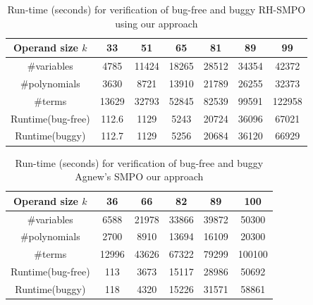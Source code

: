 \begin{table}[htb]
\centering
\caption{\small Run-time (seconds) for verification of bug-free and
  buggy RH-SMPO using our approach} 
\label{tbl:exp1}  
\begin{tabular}{|c||c|c|c|c|c|c|} 
\hline
Operand size $k$ & 33 & 51 & 65 & 81 & 89 & 99\\
\hline
\#variables & 4785 & 11424 & 18265 & 28512 & 34354 & 42372\\
\hline
\#polynomials & 3630 & 8721 & 13910 & 21789 & 26255 & 32373\\
\hline
\#terms & 13629 & 32793 & 52845 & 82539 & 99591 & 122958\\
\hline
\hline
Runtime(bug-free) & 112.6 & 1129 & 5243 & 20724 & 36096 & 67021\\
\hline
Runtime(buggy) & 112.7 & 1129 & 5256 & 20684 & 36120 & 66929\\
\hline
\end{tabular}
\end{table}

\begin{table}[hbt]
\centering
\caption{\small Run-time (seconds) for verification of
  bug-free and buggy Agnew's SMPO our approach}
\label{tbl:exp2}
\begin{tabular}{|c||c|c|c|c|c|} 
\hline
Operand size $k$ & 36 & 66 & 82 & 89 & 100 \\
\hline
\#variables & 6588 & 21978 & 33866 & 39872 & 50300\\
\hline
\#polynomials & 2700 & 8910 & 13694 & 16109 & 20300\\
\hline
\#terms & 12996 & 43626 & 67322 & 79299 & 100100 \\
\hline
\hline
Runtime(bug-free) & 113 & 3673 & 15117 & 28986 & 50692 \\
\hline
Runtime(buggy) & 118 & 4320 & 15226 & 31571 & 58861\\
\hline
\end{tabular}
\end{table}


